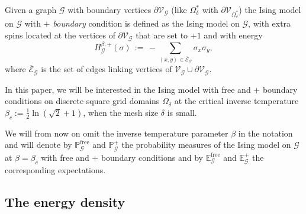 \documentclass[oneside,english]{amsart}
\numberwithin{equation}{section}
\numberwithin{figure}{section}
\theoremstyle{plain}
\theoremstyle{plain}
\theoremstyle{plain}
\theoremstyle{plain}
\theoremstyle{plain}
\theoremstyle{definition}
\theoremstyle{remark}
\begin{document}
Given a graph $\mathcal{G}$ with boundary vertices $\partial\mathcal{V}_{\mathcal{G}}$
(like $\Omega_{\delta}^{*}$ with $\partial\mathcal{V}_{\Omega_{\delta}^{*}}$)
the Ising model on $\mathcal{G}$ with\emph{ $+$ boundary }condition\emph{
}is defined as the Ising model on $\mathcal{G}$, with extra spins
located at the vertices of $\partial\mathcal{V}_{\mathcal{G}}$ that
are set to $+1$ and with energy 
\[
H_{\mathcal{G}}^{\beta,+}\left(\sigma\right)\,:=\,-\sum_{\left\langle x,y\right\rangle \in\mathcal{\overline{E}_{\mathcal{G}}}}\sigma_{x}\sigma_{y},
\]
where $\overline{\mathcal{E}}_{\mathcal{G}}$ is the set of edges
linking vertices of $\mathcal{V}_{\mathcal{G}}\cup\partial\mathcal{V}_{\mathcal{G}}$. 

In this paper, we will be interested in the Ising model with free
and $+$ boundary conditions on discrete square grid domains $\Omega_{\delta}$
at the critical inverse temperature $\beta_{c}:=\frac{1}{2}\ln\left(\sqrt{2}+1\right)$,
when the mesh size $\delta$ is small. 

We will from now on omit the inverse temperature parameter $\beta$
in the notation and will denote by $\mathbb{P}_{\mathcal{G}}^{\mathrm{free}}$
and $\mathbb{P}_{\mathcal{G}}^{+}$ the probability measures of the
Ising model on $\mathcal{G}$ at $\beta=\beta_{c}$ with free and
$+$ boundary conditions and by $\mathbb{E}_{\mathcal{G}}^{\mathrm{free}}$
and $\mathbb{E}_{\mathcal{G}}^{+}$ the corresponding expectations.


\subsection{\label{sub:the-energy-density}The energy density}
\end{document}
